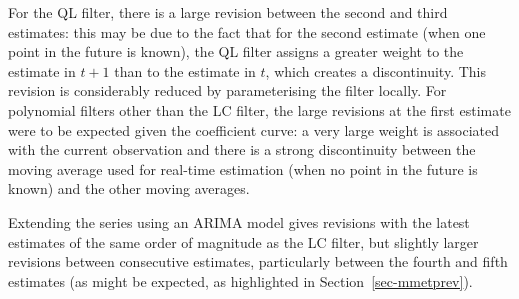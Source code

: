 \documentclass[
]{article}
\newcommand\1{\mathds{1}}
\begin{document}
For the QL filter, there is a large revision between the second and
third estimates: this may be due to the fact that for the second
estimate (when one point in the future is known), the QL filter assigns
a greater weight to the estimate in \(t+1\) than to the estimate in
\(t\), which creates a discontinuity. This revision is considerably
reduced by parameterising the filter locally. For polynomial filters
other than the LC filter, the large revisions at the first estimate were
to be expected given the coefficient curve: a very large weight is
associated with the current observation and there is a strong
discontinuity between the moving average used for real-time estimation
(when no point in the future is known) and the other moving averages.

Extending the series using an ARIMA model gives revisions with the
latest estimates of the same order of magnitude as the LC filter, but
slightly larger revisions between consecutive estimates, particularly
between the fourth and fifth estimates (as might be expected, as
highlighted in Section~\ref{sec-mmetprev}).
\end{document}
